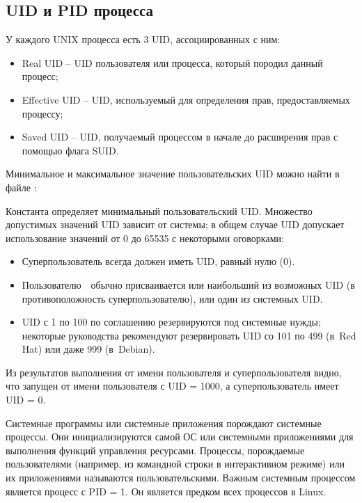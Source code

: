\subsection{UID и PID процесса}

У каждого UNIX процесса есть 3 UID, ассоциированных с ним:

\begin{itemize}
	\item Real UID -- UID пользователя или процесса, который породил данный процесс;
	\item Effective UID -- UID, используемый для определения прав, предоставляемых процессу;
	\item Saved UID -- UID, получаемый процессом в начале до расширения прав с помощью флага SUID.
\end{itemize}

Минимальное и максимальное значение пользовательских UID можно найти в файле :


Константа  определяет минимальный пользовательский UID. Множество допустимых значений UID зависит от системы; в общем случае UID допускает использование значений от 0 до 65535 с некоторыми оговорками:

\begin{itemize}
	\item Суперпользователь всегда должен иметь UID, равный нулю (0).
	\item Пользователю  обычно присваивается или наибольший из возможных UID (в противоположность суперпользователю), или один из системных UID.
	\item UID с 1 по 100 по соглашению резервируются под системные нужды; некоторые руководства рекомендуют резервировать UID со 101 по 499 (в Red Hat) или даже 999 (в Debian).
\end{itemize}



Из результатов выполнения  от имени пользователя и суперпользователя видно, что  запущен от имени пользователя с UID = 1000, а суперпользователь имеет UID = 0.

Системные программы или системные приложения порождают системные процессы. Они инициализируются самой ОС или системными приложениями для выполнения функций управления ресурсами. Процессы, порождаемые пользователями (например, из командной строки в интерактивном режиме) или их приложениями называются пользовательскими. Важным системным процессом является процесс  с PID = 1. Он является предком всех процессов в Linux.

